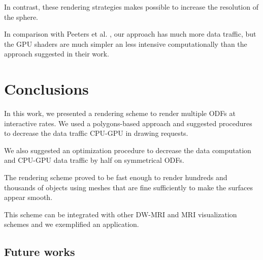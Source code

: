 \documentclass[twoside,twocolumn,10pt]{article}
\begin{document}
In contrast, these rendering strategies makes possible to increase the resolution of the sphere.

In comparison with Peeters et al. \cite{peeters2009}, our approach has much more data traffic, but the GPU shaders are much simpler an less intensive computationally than the approach suggested in their work.







\section{Conclusions}
\label{sec::conclusions}

In this work, we presented a rendering scheme to render multiple ODFs at interactive rates. We used a polygons-based approach and suggested procedures to decrease the data traffic CPU-GPU in drawing requests.

We also suggested an optimization procedure to decrease the data computation and CPU-GPU data traffic by half on symmetrical ODFs.

The rendering scheme proved to be fast enough to render hundreds and thousands of objects using meshes that are fine sufficiently to make the surfaces appear smooth.

This scheme can be integrated with other DW-MRI and MRI visualization schemes and we exemplified an application. %

\subsection{Future works}
\end{document}

